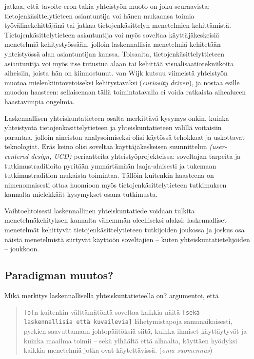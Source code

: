 \documentclass[finnish,gradu,twoside,12pt]{tktltiki}
\begin{document}
{\citet{Wijk2006} jatkaa, että tavoite-eron takia yhteistyön muoto on joku seuraavista: tietojenkäsittelytieteen asiantuntija voi hänen mukaansa toimia työvälinekehittäjänä tai jatkaa tietojenkäsittelyn menetelmien kehittämistä. Tietojenkäsittelytieteen asiantuntija voi myös soveltaa käyttäjäkeskeisiä menetelmiä kehitystyössään, jolloin laskennallisia menetelmiä kehitetään yhteistyössä alan asiantuntijan kanssa. Toisaalta, tietojenkäsittelyttieteen asiantuntija voi myös itse tutustua alaan tai kehittää visualisaatiotekniikoita aiheisiin, joista hän on kiinnostunut. van Wijk kutsuu viimeistä yhteistyön muotoa mielenkiintovetoiseksi kehitystavaksi (\textit{curiosity driven}), ja nostaa esille muodon haasteen: sellaisenaan tällä toimintatavalla ei voida ratkaista aihealueen haastavimpia ongelmia.

Laskennallisen yhteiskuntatieteen osalta merkittävä kysymys onkin, kuinka yhteistyötä tietojenkäsittelytieteen ja yhteiskuntatieteen välillä voitaisiin parantaa, jolloin aineiston analysoimiseksi olisi käytössä tehokkaat ja uskottavat teknologiat. Eräs keino olisi soveltaa käyttäjäkeskeisen suunnittelun \textit{(user-centered design, UCD)} periaatteita yhteistyöprojekteissa: soveltajan tarpeita ja tutkimustraditioita pyritään ymmärtämään laaja-alaisesti ja tukemaan tutkimustradition mukaista toimintaa. Tällöin kuitenkin haasteena on nimenomaisesti ottaa huomioon myös tietojenkäsittelytieteen tutkimuksen kannalta mielekkäät kysymykset osana tutkimusta.

Vaihtoehtoisesti laskennallinen yhteiskuntatiede voidaan tulkita menetelmäkehityksen kannalta vähemmän oleelliseksi alaksi: laskennalliset menetelmät kehittyvät tietojenkäsittelytieteen tutkijoiden joukossa ja joskus osa näistä menetelmistä siirtyvät käyttöön soveltajien -- kuten yhteiskuntatietelijöiden -- joukkoon.

\subsection{Paradigman muutos?}

Mikä merkitys laskennallisella yhteiskuntatieteellä on? \citet[265]{watts11} argumentoi, että

\begin{quote}
\texttt{[o]}n kuitenkin välttämätöntä soveltaa kaikkia näitä \texttt{[sekä laskennallisia että kuvailevia]} lähetymistapoja samanaikaisesti, pyrkien saavuttamaan johtopäätöksiä siitä, kuinka ihmiset käyttäytyvät ja kuinka maailma toimii -- sekä ylhäältä että alhaalta, käyttäen hyödyksi kaikkia menetelmiä jotka ovat käytettävissä. (\textit{oma suomennus})
\end{quote}

}
\end{document}
